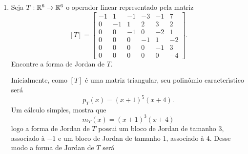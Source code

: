 \begin{exemplo}
\begin{enumerate}
\begin{solucao}
\begin{align*}
\begin{gmatrix}[b]
					9 & -3 & -7 & -1\\
					0 & 0 & 4 & -8\\
					0 & 0 & 2 & -4
					\rowops
			   		\add[-3]{0}{1}
			   		\add[-1/2]{2}{3}
     			\end{gmatrix}\leadsto\begin{gmatrix}[b]
  					3 & -1 & 1 & -7\\
					0 & 0 & -10 & -20\\
					0 & 0 & 4 & -8\\
					0 & 0 & 0 & 0
					\rowops
			   		\add[-0,4]{1}{2}
     			\end{gmatrix}\leadsto\begin{bmatrix}
  					3 & -1 & 1 & -7\\
					0 & 0 & -10 & -20\\
					0 & 0 & 0 & 0\\
					0 & 0 & 0 & 0
     			\end{bmatrix}
			\end{align*}
			e assim $\dim_\cp{K}\aut_T(a) = 2$, isto \'e, existem dois blocos de Jordan. Portanto, existe uma base $\mathcal{B}$ de $V$ tal que
			\[
				[T]_{B} = \left[\begin{tabular}{cc|cc}
 					0 & 0 &  & \\
 					1 & 0 &  & \\ \cline{1-4}
 					&  & 0 & 0 \\
 					&  & 1 & 0
 				\end{tabular}
				\right].
			\]
		\end{solucao}
		\item Seja $T : \mathbb{R}^6 \to \mathbb{R}^6$ o operador linear representado pela matriz
		\[
			[T] = \begin{bmatrix}
				-1 & 1 & -1 & -3 & -1 & 7\\
				0 & -1 & 1 & 2 & 3 & 2\\
				0 & 0 & -1 & 0 & -2 & 1\\
				0 & 0 & 0 & -1 & 1 & -2\\
				0 & 0 & 0 & 0 & -1 & 3\\
				0 & 0 & 0 & 0 & 0 & -4
			\end{bmatrix}.
		\]
		Encontre a forma de Jordan de $T$.
		\begin{solucao}
			Inicialmente, como $[T]$ \'e uma matriz triangular, seu polin\^omio caracter{\'\i}stico ser\'a
			\[
				p_T(x) = (x + 1)^5(x + 4).
			\]
			Um c\'alculo simples, mostra que
			\[
				m_T(x) = (x + 1)^3(x + 4)
			\]
			logo a forma de Jordan de $T$ possui um bloco de Jordan de tamanho 3, associado \`a $-1$ e um bloco de Jordan de tamanho 1, associado \`a $4$. Desse modo a forma de Jordan de $T$ ser\'a

\end{solucao}
\end{enumerate}
\end{exemplo}
